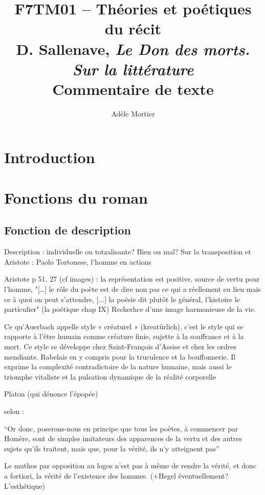 \documentclass[a4paper,10pt]{article}
\title{F7TM01 -- Théories et poétiques du récit\\
	 D. Sallenave, \textit{Le Don des morts. Sur la littérature}\\ \vspace{0.3cm}
	 \small Commentaire de texte}
\author{Adèle Mortier}
\begin{document}
	\maketitle
	\nocite{*}
	\section*{Introduction}
	\section{Fonctions du roman}
		\subsection{Fonction de description}
			Description : individuelle ou totzalisante? Bien ou mal?
			Sur la transposition et Aristote : Paolo Tortonese, l'homme en actions
		
		
			Aristote p 51, 27 (cf images) : la représentation est positive, source de vertu pour l'homme, "[…] le rôle du poète est de dire non pas ce qui a réellement eu lieu mais ce à quoi on peut s’attendre, [...]  la poésie dit plutôt le général, l’histoire le particulier" (la poétique chap IX) Recherhce d'une image harmonieuse de la vie.
			
			
			
			Ce qu’Auerbach appelle style « créaturel » (kreatürlich), c’est le style qui se rapporte à l’être humain comme créature finie, sujette à la souffrance et à la mort. Ce style se développe chez Saint-François d’Assise et chez les ordres mendiants. Rabelais en y compris pour la
			truculence et la bouffonnerie. Il exprime la complexité contradictoire de la nature humaine,
			mais aussi le triomphe vitaliste et la pulsation dynamique de la réalité corporelle
			
			
			
			
			
			Platon (qui dénonce l'épopée)
			
			selon \cite{Platon}:
			\begin{center}
				\footnotesize
				\begin{minipage}{0.7\textwidth}
					``Or donc, poserons-nous en principe que tous les poètes, à commencer par Homère, sont de simples imitateurs
					des apparences de la vertu et des autres sujets qu’ils traitent, mais que, pour la vérité, ils n’y atteignent pas''
				\end{minipage}
			\end{center}
			Le muthos par opposition au logos n'est pas à même de rendre la vérité, et donc a fortiori, la vérité de l'existence des hommes. (+Hegel éventuellement? L'esthétique)
			
\end{document}
